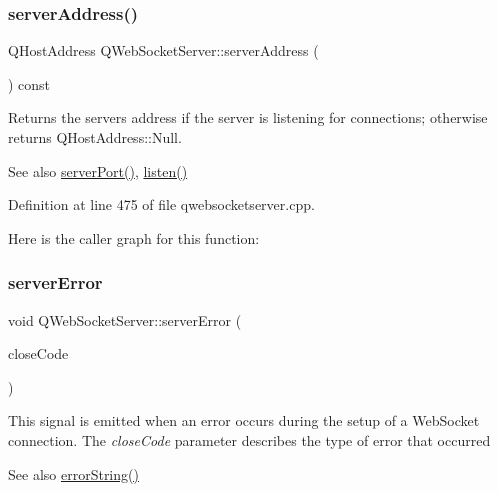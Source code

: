 \subsubsection{\texorpdfstring{server\+Address()}{serverAddress()}}
{\footnotesize\ttfamily Q\+Host\+Address Q\+Web\+Socket\+Server\+::server\+Address (\begin{DoxyParamCaption}{ }\end{DoxyParamCaption}) const}

Returns the server\textquotesingle{}s address if the server is listening for connections; otherwise returns Q\+Host\+Address\+::\+Null.

\begin{DoxySeeAlso}{See also}
\mbox{\hyperlink{class_q_web_socket_server_aafc6ff4b146c2b049df45922a2d9be7e}{server\+Port()}}, \mbox{\hyperlink{class_q_web_socket_server_a3859403d15dbb2b487a3990d68660841}{listen()}} 
\end{DoxySeeAlso}


Definition at line 475 of file qwebsocketserver.\+cpp.

Here is the caller graph for this function\+:
\mbox{\label{class_q_web_socket_server_ae0252a3e66f2f1c7e80b99508390df24}} 
\subsubsection{\texorpdfstring{server\+Error}{serverError}}
{\footnotesize\ttfamily void Q\+Web\+Socket\+Server\+::server\+Error (\begin{DoxyParamCaption}\item[{\mbox{\hyperlink{namespace_q_web_socket_protocol_a9f236676f594451d8d723f260b71028c}{Q\+Web\+Socket\+Protocol\+::\+Close\+Code}}}]{close\+Code }\end{DoxyParamCaption})\hspace{0.3cm}{\ttfamily [signal]}}

This signal is emitted when an error occurs during the setup of a Web\+Socket connection. The {\itshape close\+Code} parameter describes the type of error that occurred

\begin{DoxySeeAlso}{See also}
\mbox{\hyperlink{class_q_web_socket_server_a7c86fee3522b6ba2aad22418fbace5bd}{error\+String()}} 
\end{DoxySeeAlso}


